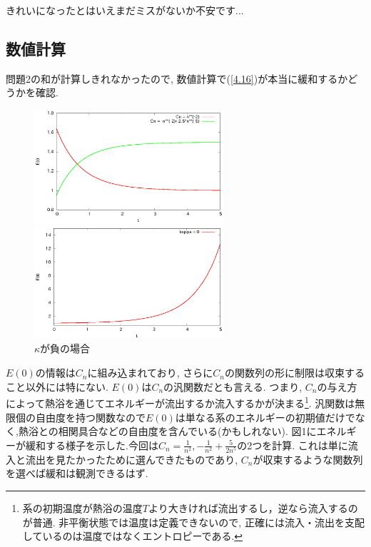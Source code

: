 \documentclass[10.5pt,a4paper]{jreport}
\makeatletter
\newcommand{\figcaption}[1]{\def\@captype{figure}\caption{#1}} %
\makeatother
\begin{document}
きれいになったとはいえまだミスがないか不安です...
\subsection{数値計算}
問題2の和が計算しきれなかったので, 数値計算で(\ref{4.16})が本当に緩和するかどうかを確認.
\begin{figure}[htbp]
  \begin{minipage}{0.5\hsize}
    \centering
    \includegraphics[width = 7cm]{./EPS/fig1.eps}
    \figcaption{$\kappa = \overline{n} = 1$}
    \label{fig1}
  \end{minipage}
  \begin{minipage}{0.5\hsize}
    \centering
    \includegraphics[width = 7cm]{./EPS/fig2.eps}
    \figcaption{$\kappa$が負の場合}
    \label{fig2}
  \end{minipage}
\end{figure}
$E(0)$の情報は$C_n$に組み込まれており, さらに$C_n$の関数列の形に制限は収束すること以外には特にない. $E(0)$は$C_n$の汎関数だとも言える. つまり, $C_n$の与え方によって熱浴を通じてエネルギーが流出するか流入するかが決まる\footnote{系の初期温度が熱浴の温度$T$より大きければ流出するし，逆なら流入するのが普通. 非平衡状態では温度は定義できないので, 正確には流入・流出を支配しているのは温度ではなくエントロピーである.}. 汎関数は無限個の自由度を持つ関数なので$E(0)$は単なる系のエネルギーの初期値だけでなく,熱浴との相関具合などの自由度を含んでいる(かもしれない). 図1にエネルギーが緩和する様子を示した.今回は$C_n = \frac{1}{n^2}, -\frac{1}{n^2} + \frac{5}{2n^5}$の2つを計算. これは単に流入と流出を見たかったために選んできたものであり, $C_n$が収束するような関数列を選べば緩和は観測できるはず.
\end{document}

